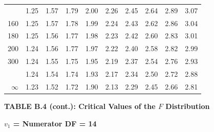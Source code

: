 \documentclass[10pt]{article}
\begin{document}
\begin{longtable}{@{}r!{\vrule width 0.8pt\hspace{0.55em}}rrrrrrrrr@{}}
 & 1.25 & 1.57 & 1.79 & 2.00 & 2.26 & 2.45 & 2.64 & 2.89 & 3.07 \\
160 & 1.25 & 1.57 & 1.78 & 1.99 & 2.24 & 2.43 & 2.62 & 2.86 & 3.04 \\
180 & 1.25 & 1.56 & 1.77 & 1.98 & 2.23 & 2.42 & 2.60 & 2.83 & 3.01 \\
200 & 1.24 & 1.56 & 1.77 & 1.97 & 2.22 & 2.40 & 2.58 & 2.82 & 2.99 \\
300 & 1.24 & 1.55 & 1.75 & 1.95 & 2.19 & 2.37 & 2.54 & 2.76 & 2.93 \\
 & 1.24 & 1.54 & 1.74 & 1.93 & 2.17 & 2.34 & 2.50 & 2.72 & 2.88 \\
$\infty$ & 1.23 & 1.52 & 1.72 & 1.90 & 2.13 & 2.29 & 2.45 & 2.66 & 2.81 \\
\end{longtable}
\newpage
\thispagestyle{empty}
\begin{center}
{\large\bfseries TABLE B.4 (cont.): Critical Values of the $F$ Distribution\par}
\end{center}
{\large\bfseries $v_1$ = Numerator DF = 14\par}
\vspace{0.5em}
\small
\end{document}
